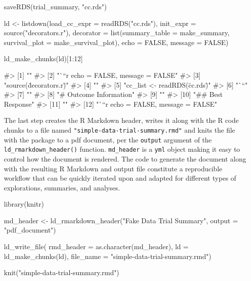 \begin{Schunk}
\begin{Sinput}
saveRDS(trial_summary, "cc.rds")

ld <- listdown(load_cc_expr = readRDS("cc.rds"),
               init_expr = source("decorators.r"),
               decorator = list(summary_table = make_summary,
                                survival_plot = make_survival_plot),
               echo = FALSE,
               message = FALSE)

ld_make_chunks(ld)[1:12]
\end{Sinput}
\begin{Soutput}
#>  [1] ""                                    
#>  [2] "```{r echo = FALSE, message = FALSE}"
#>  [3] "source(\"decorators.r\")"            
#>  [4] ""                                    
#>  [5] "cc_list <- readRDS(\"cc.rds\")"      
#>  [6] "```"                                 
#>  [7] ""                                    
#>  [8] "# Outcome Information"               
#>  [9] ""                                    
#> [10] "## Best Response"                    
#> [11] ""                                    
#> [12] "```{r echo = FALSE, message = FALSE}"
\end{Soutput}
\end{Schunk}

The last step creates the R Markdown header, writes it along with the R
code chunks to a file named \texttt{"simple-data-trial-summary.rmd"} and
knits the file with the  package \citep{knitr} to a pdf
document, per the \texttt{output} argument of the
\texttt{ld\_rmarkdown\_header()} function. \texttt{md\_header} is a
\texttt{yml} object making it easy to control how the document is
rendered. The code to generate the document along with the resulting R
Markdown and output file constitute a reproducible workflow that can be
quickly iterated upon and adapted for different types of explorations,
summaries, and analyses.

\begin{Schunk}
\begin{Sinput}
library(knitr)

md_header <- ld_rmarkdown_header("Fake Data Trial Summary",
                                 output = "pdf_document")

ld_write_file(
  rmd_header = as.character(md_header),
  ld = ld_make_chunks(ld),
  file_name = "simple-data-trial-summary.rmd")

knit("simple-data-trial-summary.rmd")
\end{Sinput}
\end{Schunk}

